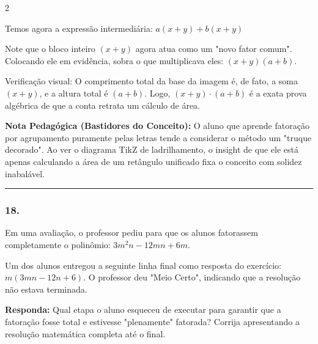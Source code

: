 \begin{multicols*}{2}
\begin{tcolorbox}[colback=CorTitUm!5, colframe=CorTitUm, boxrule=1pt, arc=4pt, left=6pt, right=6pt, top=6pt, bottom=6pt]
    Temos agora a expressão intermediária:
    $ a(x + y) + b(x + y) $
    
    Note que o bloco inteiro $ (x + y) $ agora atua como um "novo fator comum". Colocando ele em evidência, sobra o que multiplicava eles:
    $ (x + y)(a + b) $.
    
    Verificação visual: O comprimento total da base da imagem é, de fato, a soma $ (x + y) $, e a altura total é $ (a + b) $. Logo, $ (x + y) \cdot (a + b) $ é a exata prova algébrica de que a conta retrata um cálculo de área.
    \end{tcolorbox}
    \vspace{0.15cm}
    
    \begin{boxexplicacao}
    \textbf{Nota Pedagógica (Bastidores do Conceito):} O aluno que aprende fatoração por agrupamento puramente pelas letras tende a considerar o método um "truque decorado". Ao ver o diagrama TikZ de ladrilhamento, o insight de que ele está apenas calculando a área de um retângulo unificado fixa o conceito com solidez inabalável.
    \end{boxexplicacao}
\fi

\par\vspace{\espacoQuestao}

\noindent\textcolor{CorLinha}{\rule{\linewidth}{0.5pt}} 
\par\vspace{\espacoPreQuestao}
\subsubsection*{18.} 
\begin{enunciadoLiteral}
Em uma avaliação, o professor pediu para que os alunos fatorassem completamente o polinômio: $ 3m^2n - 12mn + 6m $. 

Um dos alunos entregou a seguinte linha final como resposta do exercício: $ m(3mn - 12n + 6) $. O professor deu "Meio Certo", indicando que a resolução não estava terminada.

\begin{boxresponda}
\textbf{Responda:} Qual etapa o aluno esqueceu de executar para garantir que a fatoração fosse total e estivesse "plenamente" fatorada? Corrija apresentando a resolução matemática completa até o final.
\end{boxresponda}
\end{enunciadoLiteral}


\end{multicols*}
